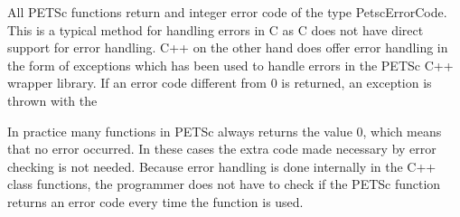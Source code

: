 All PETSc functions return and integer error code of the type PetscErrorCode.
This is a typical method for handling errors in C as C does not have direct
support for error handling. C++ on the other hand does offer error handling in
the form of exceptions which has been used to handle errors in the PETSc C++
wrapper library. If an error code different from 0 is returned, an exception
is thrown with the 

In practice many functions in PETSc always returns the value 0, which means that
no error occurred. 
In these cases the extra code made necessary by error checking is not needed.
Because error handling is done internally in the C++ class functions, the
programmer does not have to check if the PETSc function returns an error code
every time the function is used.
